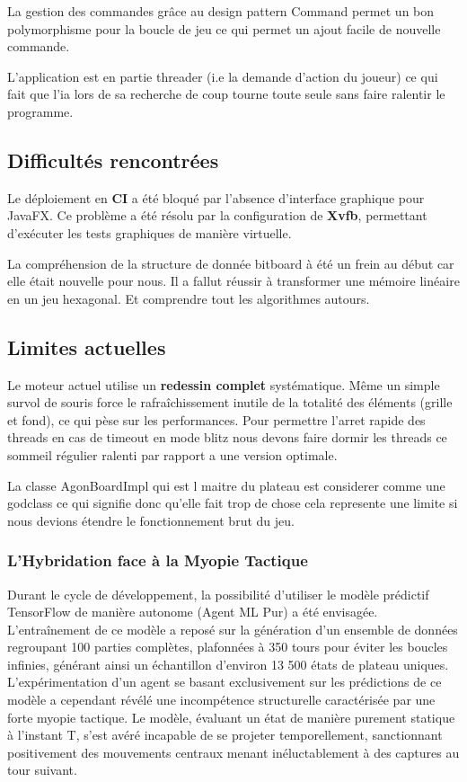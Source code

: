 \documentclass[a4paper]{article}
\begin{document}
La gestion des commandes grâce au design pattern Command permet un bon polymorphisme pour la boucle de jeu ce qui permet un ajout facile de nouvelle commande.

L'application est en partie threader (i.e la demande d'action du joueur) ce qui fait que l'ia lors de sa recherche de coup tourne toute seule sans faire ralentir le programme.


\subsection{Difficultés rencontrées}
Le déploiement en \textbf{CI} a été bloqué par l'absence d'interface graphique pour JavaFX. Ce problème a été résolu par la configuration de \textbf{Xvfb}, permettant d'exécuter les tests graphiques de manière virtuelle.

La compréhension de la structure de donnée bitboard à été un frein au début car elle était nouvelle pour nous. Il a fallut réussir à transformer une mémoire linéaire en un jeu hexagonal. Et comprendre tout les algorithmes autours.
\subsection{Limites actuelles}
Le moteur actuel utilise un \textbf{redessin complet} systématique. Même un simple survol de souris force le rafraîchissement inutile de la totalité des éléments (grille et fond), ce qui pèse sur les performances.
Pour permettre l'arret rapide des threads en cas de timeout en mode blitz nous devons faire dormir les threads ce sommeil régulier ralenti par rapport a une version optimale.

La classe AgonBoardImpl qui est l maitre du plateau est considerer comme une godclass ce qui signifie donc qu'elle fait trop de chose cela represente une limite si nous devions étendre le fonctionnement brut du jeu.

\subsubsection{L'Hybridation face à la Myopie Tactique}

Durant le cycle de développement, la possibilité d'utiliser le modèle prédictif TensorFlow de manière autonome (Agent ML Pur) a été envisagée. L'entraînement de ce modèle a reposé sur la génération d'un ensemble de données regroupant 100 parties complètes, plafonnées à 350 tours pour éviter les boucles infinies, générant ainsi un échantillon d'environ 13 500 états de plateau uniques. L'expérimentation d'un agent se basant exclusivement sur les prédictions de ce modèle a cependant révélé une incompétence structurelle caractérisée par une forte myopie tactique. Le modèle, évaluant un état de manière purement statique à l'instant T, s'est avéré incapable de se projeter temporellement, sanctionnant positivement des mouvements centraux menant inéluctablement à des captures au tour suivant.
\end{document}
